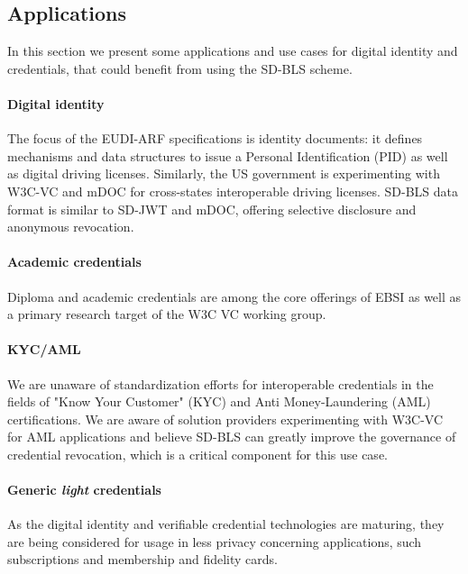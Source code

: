 \subsection{Applications}
In this section we present some applications and use cases for digital
identity and credentials, that could benefit from using the SD-BLS
scheme.

\paragraph{Digital identity}
The focus of the EUDI-ARF specifications is identity documents: it
defines mechanisms and data structures to issue a Personal
Identification (PID) as well as digital driving licenses. Similarly,
the US government is experimenting with W3C-VC and mDOC for
cross-states interoperable driving licenses. SD-BLS data format is
similar to SD-JWT and mDOC, offering selective disclosure and
anonymous revocation.

\paragraph{Academic credentials}
Diploma and academic credentials are among the core offerings of EBSI
as well as a primary research target of the W3C VC working group.

\paragraph{KYC/AML}
We are unaware of standardization efforts for interoperable
credentials in the fields of "Know Your Customer" (KYC) and Anti
Money-Laundering (AML) certifications. We are aware of solution
providers experimenting with W3C-VC for AML applications and believe
SD-BLS can greatly improve the governance of credential revocation,
which is a critical component for this use case.

\paragraph{Generic \textit{light} credentials}
As the digital identity and verifiable credential technologies are
maturing, they are being considered for usage in less privacy
concerning applications, such subscriptions and membership and
fidelity cards.

